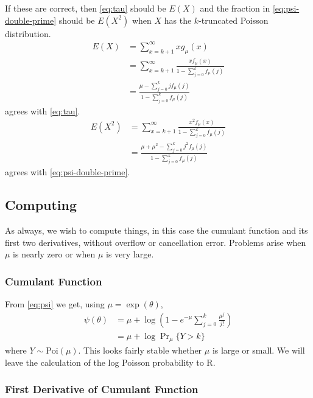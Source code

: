 \documentclass[11pt]{article}
\newcommand{\Prmu}{\Pr\nolimits_\mu}
\begin{document}
If these are correct, then \eqref{eq:tau} should be $E(X)$ and 
the fraction in \eqref{eq:psi-double-prime} should be $E(X^2)$ when $X$ has
the $k$-truncated Poisson distribution.
\begin{align*}
    E(X)
    & =
    \sum_{x = k + 1}^\infty x g_\mu(x)
    \\
    & =
    \sum_{x = k + 1}^\infty \frac{x f_\mu(x)}{1 - \sum_{j = 0}^k f_\mu(j)}
    \\
    & =
    \frac{\mu - \sum_{j = 0}^k j f_\mu(j)}{1 - \sum_{j = 0}^k f_\mu(j)}
\end{align*}
agrees with \eqref{eq:tau}.
\begin{align*}
    E(X^2)
    & =
    \sum_{x = k + 1}^\infty \frac{x^2 f_\mu(x)}{1 - \sum_{j = 0}^k f_\mu(j)}
    \\
    & =
    \frac{\mu + \mu^2 - \sum_{j = 0}^k j^2 f_\mu(j)}{1 - \sum_{j = 0}^k f_\mu(j)}
\end{align*}
agrees with \eqref{eq:psi-double-prime}.

\subsection{Computing}

As always, we wish to compute things, in this case the cumulant function and its
first two derivatives, without overflow or cancellation error.
Problems arise when $\mu$ is nearly zero or when $\mu$ is very large.

\subsubsection{Cumulant Function}

From \eqref{eq:psi} we get, using $\mu = \exp(\theta)$,
\begin{equation} \label{eq:psi-comp}
\begin{split}
    \psi(\theta)
    & =
    \mu + \log \left(1 - e^{- \mu} \sum_{j = 0}^k \frac{\mu^j}{j !} \right)
    \\
    & =
    \mu + \log \Prmu \{ Y > k \}
\end{split}
\end{equation}
where $Y \sim \text{Poi}(\mu)$.  This looks fairly stable whether $\mu$ is large or small.
We will leave the calculation of the log Poisson probability to R.

\subsubsection{First Derivative of Cumulant Function}
\end{document}

